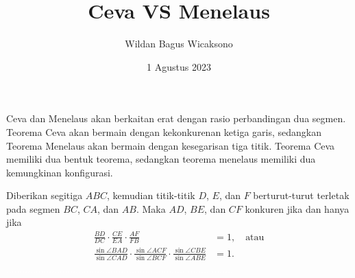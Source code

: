 \documentclass[12pt]{scrartcl}
\title{\textbf{Ceva VS Menelaus}}
\author{Wildan Bagus Wicaksono}
\date{1 Agustus 2023}
\begin{document}
\maketitle

\renewcommand*\contentsname{Daftar Isi}
\tableofcontents

\newpage

Ceva dan Menelaus akan berkaitan erat dengan rasio perbandingan dua segmen. Teorema Ceva akan bermain dengan kekonkurenan ketiga garis, sedangkan Teorema Menelaus akan bermain dengan kesegarisan tiga titik. Teorema Ceva memiliki dua bentuk teorema, sedangkan teorema menelaus memiliki dua kemungkinan konfigurasi.
\begin{tcolorbox}[colback=green!5!white,colframe=ForestGreen!75!black,title=\textbf{Teorema 1: Ceva}]
\begin{figure}
\end{figure}
Diberikan segitiga $ABC$, kemudian titik-titik $D$, $E$, dan $F$ berturut-turut terletak pada segmen $BC$, $CA$, dan $AB$. 
Maka $AD$, $BE$, dan $CF$ konkuren jika dan hanya jika
\begin{align*}
\frac{BD}{DC}\cdot \frac{CE}{EA}\cdot \frac{AF}{FB} &= 1,\quad \text{atau}\\
\frac{\sin \angle BAD}{\sin \angle CAD}\cdot \frac{\sin \angle ACF}{\sin \angle BCF}\cdot \frac{\sin \angle CBE}{\sin \angle ABE} &= 1.
\end{align*}
\textcolor{white}{......................................................................................}
\end{tcolorbox}
\end{document}
